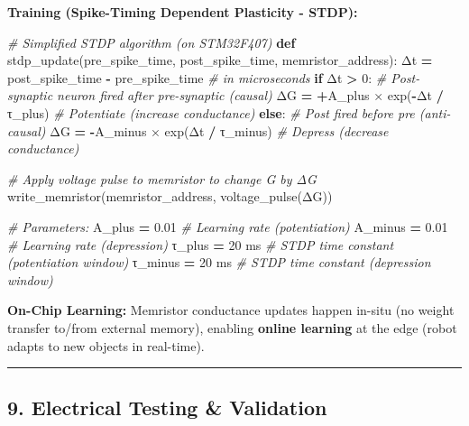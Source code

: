 \documentclass[
]{article}
\newenvironment{Shaded}{\begin{snugshade}}{\end{snugshade}}
\newcommand{\CommentTok}[1]{\textcolor[rgb]{0.56,0.35,0.01}{\textit{#1}}}
\newcommand{\ControlFlowTok}[1]{\textcolor[rgb]{0.13,0.29,0.53}{\textbf{#1}}}
\newcommand{\DecValTok}[1]{\textcolor[rgb]{0.00,0.00,0.81}{#1}}
\newcommand{\FloatTok}[1]{\textcolor[rgb]{0.00,0.00,0.81}{#1}}
\newcommand{\KeywordTok}[1]{\textcolor[rgb]{0.13,0.29,0.53}{\textbf{#1}}}
\newcommand{\NormalTok}[1]{#1}
\newcommand{\OperatorTok}[1]{\textcolor[rgb]{0.81,0.36,0.00}{\textbf{#1}}}
\begin{document}
\textbf{Training (Spike-Timing Dependent Plasticity - STDP):}

\begin{Shaded}
\begin{Highlighting}[]
\CommentTok{\# Simplified STDP algorithm (on STM32F407)}
\KeywordTok{def}\NormalTok{ stdp\_update(pre\_spike\_time, post\_spike\_time, memristor\_address):}
\NormalTok{    Δt }\OperatorTok{=}\NormalTok{ post\_spike\_time }\OperatorTok{{-}}\NormalTok{ pre\_spike\_time  }\CommentTok{\# in microseconds}
    \ControlFlowTok{if}\NormalTok{ Δt }\OperatorTok{\textgreater{}} \DecValTok{0}\NormalTok{:  }\CommentTok{\# Post{-}synaptic neuron fired after pre{-}synaptic (causal)}
\NormalTok{        ΔG }\OperatorTok{=} \OperatorTok{+}\NormalTok{A\_plus × exp(}\OperatorTok{{-}}\NormalTok{Δt }\OperatorTok{/}\NormalTok{ τ\_plus)  }\CommentTok{\# Potentiate (increase conductance)}
    \ControlFlowTok{else}\NormalTok{:  }\CommentTok{\# Post fired before pre (anti{-}causal)}
\NormalTok{        ΔG }\OperatorTok{=} \OperatorTok{{-}}\NormalTok{A\_minus × exp(Δt }\OperatorTok{/}\NormalTok{ τ\_minus)  }\CommentTok{\# Depress (decrease conductance)}

    \CommentTok{\# Apply voltage pulse to memristor to change G by ΔG}
\NormalTok{    write\_memristor(memristor\_address, voltage\_pulse(ΔG))}

\CommentTok{\# Parameters:}
\NormalTok{A\_plus }\OperatorTok{=} \FloatTok{0.01}     \CommentTok{\# Learning rate (potentiation)}
\NormalTok{A\_minus }\OperatorTok{=} \FloatTok{0.01}    \CommentTok{\# Learning rate (depression)}
\NormalTok{τ\_plus }\OperatorTok{=} \DecValTok{20}\NormalTok{ ms    }\CommentTok{\# STDP time constant (potentiation window)}
\NormalTok{τ\_minus }\OperatorTok{=} \DecValTok{20}\NormalTok{ ms   }\CommentTok{\# STDP time constant (depression window)}
\end{Highlighting}
\end{Shaded}

\textbf{On-Chip Learning:} Memristor conductance updates happen in-situ
(no weight transfer to/from external memory), enabling \textbf{online
learning} at the edge (robot adapts to new objects in real-time).

\begin{center}\rule{0.5\linewidth}{0.5pt}\end{center}

\hypertarget{electrical-testing-validation}{%
\subsection{9. Electrical Testing \&
Validation}\label{electrical-testing-validation}}
\end{document}
